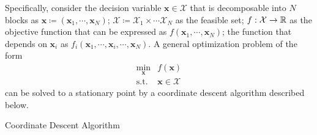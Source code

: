 Specifically, consider the decision variable $\bm x \in \mathcal X$ that is
decomposable into $N$ blocks as $\bm x \coloneqq (\bm x_1,\cdots,\bm x_N)$;
$\mathcal X \coloneqq \mathcal X_1 \times \cdots \mathcal X_N$ as the feasible
set; $f:\mathcal X \rightarrow \mathbb R$ as the objective function that can be
expressed as $f(\bm x_1,\cdots,\bm x_N)$; the function that depends on
$\bm x_i$ as $f_i(\bm x_1,\cdots,\bm x_i,\cdots,\bm x_N)$.
A general optimization problem of the form
\begin{equation}
    \begin{array}{cl}
        \underset{\bm x}{\min} & f(\bm x) \\
        \text{s.t.}            & \bm x \in \mathcal X
    \end{array}
\end{equation}
can be solved to a stationary point by a coordinate descent algorithm
described below.
\begin{algorithm}
    \caption{Coordinate Descent Algorithm}
    \label{alg:CD}
    \begin{algorithmic}[1]
            \EndFor
        \EndFor
    \end{algorithmic}
\end{algorithm}

